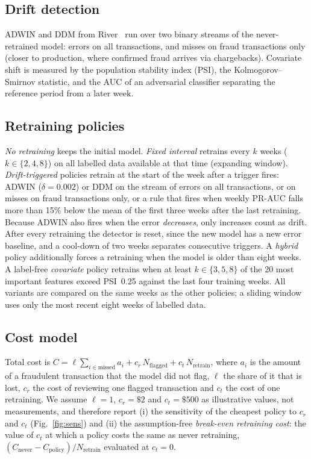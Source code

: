 \documentclass[conference]{IEEEtran}
\begin{document}
\subsection{Drift detection}
ADWIN and DDM from River~\cite{montiel2021river} run over two binary streams of the never-retrained model: errors on all transactions, and misses on
fraud transactions only (closer to production, where confirmed fraud arrives via chargebacks). Covariate shift is measured by the population stability index (PSI), the
Kolmogorov--Smirnov statistic, and the AUC of an adversarial classifier separating the reference period from a later week.
\subsection{Retraining policies}
\emph{No retraining} keeps the initial model. \emph{Fixed interval} retrains every $k$ weeks ($k\in\{2,4,8\}$) on all labelled data available at that time (expanding window).
\emph{Drift-triggered} policies retrain at the start of the week after a trigger fires: ADWIN ($\delta=0.002$) or DDM on the stream of errors on all transactions,
or on misses on fraud transactions only, or a rule that fires when weekly PR-AUC falls more than 15\% below the mean of the first three weeks after the last retraining.
Because ADWIN also fires when the error \emph{decreases}, only increases count as drift. After every retraining the detector is reset, since the new model has a new error baseline,
and a cool-down of two weeks separates consecutive triggers. A \emph{hybrid} policy additionally forces a retraining when the model is older than eight weeks.
A label-free \emph{covariate} policy retrains when at least $k\in\{3,5,8\}$ of the 20 most important features exceed PSI~0.25 against the last four training weeks. All variants are compared on the same weeks as the other policies; a sliding window uses only the most recent eight weeks of labelled data.

\subsection{Cost model}
Total cost is $C=\ell\sum_{i\in\text{missed}}a_i + c_r\,N_{\text{flagged}} + c_t\,N_{\text{retrain}}$, where $a_i$ is the amount of a fraudulent transaction that the model did not flag,
$\ell$ the share of it that is lost, $c_r$ the cost of reviewing one flagged transaction and $c_t$ the cost of one retraining.
We assume $\ell=1$, $c_r=\$2$ and $c_t=\$500$ as illustrative values, not measurements, and therefore report (i) the sensitivity of the cheapest policy to $c_r$ and $c_t$
(Fig.~\ref{fig:sens}) and (ii) the assumption-free \emph{break-even retraining cost}: the value of $c_t$ at which a policy costs the same as never retraining, $(C_{\text{never}}-C_{\text{policy}})/N_{\text{retrain}}$ evaluated at $c_t=0$.
\end{document}

